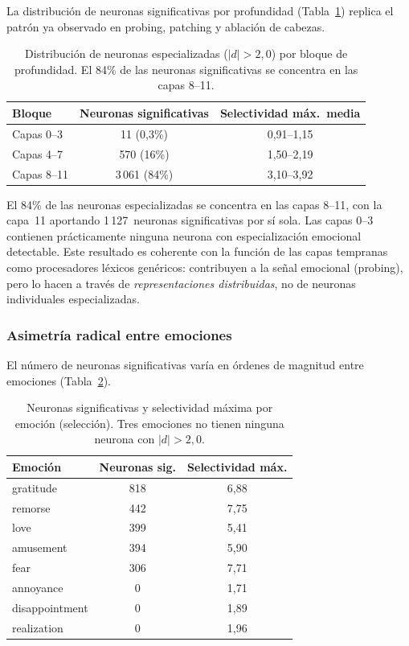 La distribución de neuronas significativas por profundidad
(Tabla~\ref{tab:neuron-profundidad}) replica el patrón ya observado
en probing, patching y ablación de cabezas.

\begin{table}[ht]
\centering
\caption{Distribución de neuronas especializadas ($|d| > 2{,}0$) por
bloque de profundidad. El 84\% de las neuronas significativas se
concentra en las capas 8--11.}
\label{tab:neuron-profundidad}
\begin{tabular}{lcc}
\toprule
\textbf{Bloque} & \textbf{Neuronas significativas} & \textbf{Selectividad máx.\ media} \\
\midrule
Capas 0--3  & 11 (0{,}3\%)    & 0{,}91--1{,}15 \\
Capas 4--7  & 570 (16\%)      & 1{,}50--2{,}19 \\
Capas 8--11 & 3\,061 (84\%)   & 3{,}10--3{,}92 \\
\bottomrule
\end{tabular}
\end{table}

El 84\% de las neuronas especializadas se concentra en las capas
8--11, con la capa~11 aportando 1\,127~neuronas significativas por sí
sola. Las capas 0--3 contienen prácticamente ninguna neurona con
especialización emocional detectable. Este resultado es coherente con
la función de las capas tempranas como procesadores léxicos genéricos:
contribuyen a la señal emocional (probing), pero lo hacen a través
de \emph{representaciones distribuidas}, no de neuronas individuales
especializadas.

\subsubsection{Asimetría radical entre emociones}

El número de neuronas significativas varía en órdenes de magnitud
entre emociones (Tabla~\ref{tab:neuron-emociones}).

\begin{table}[ht]
\centering
\caption{Neuronas significativas y selectividad máxima por emoción
(selección). Tres emociones no tienen ninguna neurona con
$|d| > 2{,}0$.}
\label{tab:neuron-emociones}
\begin{tabular}{lcc}
\toprule
\textbf{Emoción} & \textbf{Neuronas sig.} & \textbf{Selectividad máx.} \\
\midrule
gratitude      & 818 & 6{,}88 \\
remorse        & 442 & 7{,}75 \\
love           & 399 & 5{,}41 \\
amusement      & 394 & 5{,}90 \\
fear           & 306 & 7{,}71 \\
\midrule
annoyance      & 0   & 1{,}71 \\
disappointment & 0   & 1{,}89 \\
realization    & 0   & 1{,}96 \\
\bottomrule
\end{tabular}
\end{table}

